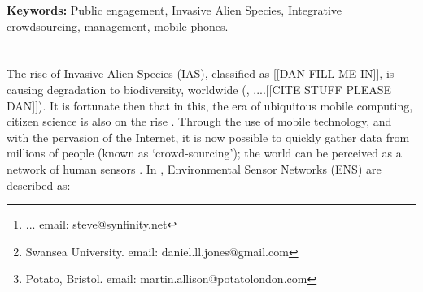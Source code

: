 \documentclass[10pt,psfig,letterpaper,twocolumn]{article}
\begin{document}
 
% 
%


\title{}
\author{
{}\thanks{... email: steve@synfinity.net }, \and
{}\thanks{Swansea University. email: daniel.ll.jones@gmail.com}, \and 
{}\thanks{Potato, Bristol. email: martin.allison@potatolondon.com}\\
}
\date{}
\maketitle
\thispagestyle{empty}
\begin{abstract}
Invasive Alien Species (IAS) are a global problem, causing reductions in biodiversity, and damaging urban and ... environments. The ability to control and manage them is hampered by a lack of spatially framed data, or by the use of temporally poor data. With the ubiquity of the smart phone, and cheap access to data networks, it should be possible to plug the spatial and temporal holes in IAS [[SPREAD]] data, using crowd-sourcing. That is, allowing the general public to log data in the name of `citizen science', providing much-needed, real-time data to scientists whilst also engaging the public. IAS-ESS (iAssess) aims to fulfil this need.
\end{abstract}
{\bf Keywords:}
Public engagement, Invasive Alien Species, Integrative crowdsourcing, management, mobile phones.
\section*{}

The rise of Invasive Alien Species (IAS), classified as [[DAN FILL ME IN]], is causing degradation to biodiversity, worldwide (\cite{Vila:2011p43803}, ....[[CITE STUFF PLEASE DAN]]). It is fortunate then that in this, the era of ubiquitous mobile computing, citizen science is also on the rise \cite{Silvertown:2009p44145}. Through the use of mobile technology, and with the pervasion of the Internet, it is now possible to quickly gather data from millions of people (known as `crowd-sourcing'\cite{Wired}); the world can be perceived as a network of human sensors \cite{Goodchild:2007p22502}. In \cite{Hart:2006}, Environmental Sensor Networks (ENS) are described as:
\end{document}
